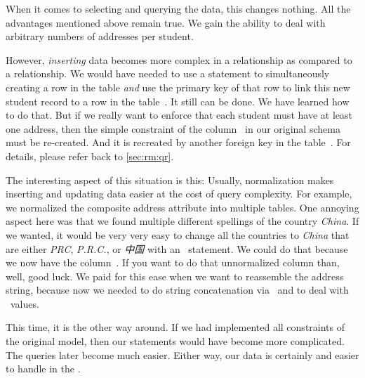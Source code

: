 When it comes to selecting and querying the data, this changes nothing.
All the advantages mentioned above remain true.
We gain the ability to deal with arbitrary numbers of addresses per student.

However, \emph{inserting} data becomes more complex in a  relationship as compared to a  relationship.
We would have needed to use a  statement to simultaneously creating a row in the  table \emph{and} use the primary key of that row to link this new student record to a row in the table~.
It still can be done.
We have learned how to do that.
But if we really want to enforce that each student must have at least one address, then the simple  constraint of the column~ in our original schema must be re-created.
And it is recreated by another foreign key in the table~.
For details, please refer back to \cref{sec:rm:qr}.

The interesting aspect of this situation is this:
Usually, normalization makes inserting and updating data easier at the cost of query complexity.
For example, we normalized the composite address attribute into multiple tables.
One annoying aspect here was that we found multiple different spellings of the country \emph{China}.
If we wanted, it would be very very easy to change all the countries to \emph{China} that are either \emph{PRC}, \emph{P.R.C.}, or \emph{中国} with an ~statement.
We could do that because we now have the column~.
If you want to do that unnormalized  column than, well, good luck.
We paid for this ease when we want to reassemble the address string, because now we needed to do string concatenation via~\sqlil{||}\sqlIdx{\textbar\textbar} and  to deal with ~values.

This time, it is the other way around.
If we had implemented all constraints of the original model, then our  statements would have become more complicated.
The queries later become much easier.
Either way, our data is certainly  and easier to handle in the .%
\FloatBarrier%
\endhsection%
%
